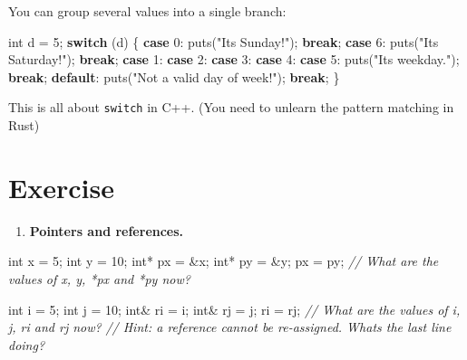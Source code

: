 \documentclass[
]{book}
\newenvironment{Shaded}{\begin{snugshade}}{\end{snugshade}}
\newcommand{\CommentTok}[1]{\textcolor[rgb]{0.56,0.35,0.01}{\textit{#1}}}
\newcommand{\ControlFlowTok}[1]{\textcolor[rgb]{0.13,0.29,0.53}{\textbf{#1}}}
\newcommand{\DataTypeTok}[1]{\textcolor[rgb]{0.13,0.29,0.53}{#1}}
\newcommand{\DecValTok}[1]{\textcolor[rgb]{0.00,0.00,0.81}{#1}}
\newcommand{\NormalTok}[1]{#1}
\newcommand{\StringTok}[1]{\textcolor[rgb]{0.31,0.60,0.02}{#1}}
\providecommand{\tightlist}{%
  \setlength{\itemsep}{0pt}\setlength{\parskip}{0pt}}
\begin{document}
You can group several values into a single branch:

\begin{Shaded}
\begin{Highlighting}[]
\DataTypeTok{int}\NormalTok{ d = }\DecValTok{5}\NormalTok{;}
\ControlFlowTok{switch}\NormalTok{ (d)}
\NormalTok{\{}
\ControlFlowTok{case} \DecValTok{0}\NormalTok{:}
\NormalTok{    puts(}\StringTok{"It\textquotesingle{}s Sunday!"}\NormalTok{);}
    \ControlFlowTok{break}\NormalTok{;}
\ControlFlowTok{case} \DecValTok{6}\NormalTok{:}
\NormalTok{    puts(}\StringTok{"It\textquotesingle{}s Saturday!"}\NormalTok{);}
    \ControlFlowTok{break}\NormalTok{;}
\ControlFlowTok{case} \DecValTok{1}\NormalTok{:}
\ControlFlowTok{case} \DecValTok{2}\NormalTok{:}
\ControlFlowTok{case} \DecValTok{3}\NormalTok{:}
\ControlFlowTok{case} \DecValTok{4}\NormalTok{:}
\ControlFlowTok{case} \DecValTok{5}\NormalTok{:}
\NormalTok{    puts(}\StringTok{"It\textquotesingle{}s weekday."}\NormalTok{);}
    \ControlFlowTok{break}\NormalTok{;}
\ControlFlowTok{default}\NormalTok{:}
\NormalTok{    puts(}\StringTok{"Not a valid day of week!"}\NormalTok{);}
    \ControlFlowTok{break}\NormalTok{;}
\NormalTok{\}}
\end{Highlighting}
\end{Shaded}

This is all about \texttt{switch} in C++. (You need to unlearn the pattern matching in Rust)

\hypertarget{exercise}{%
\section*{Exercise}\label{exercise}}

\begin{enumerate}
\def\labelenumi{\arabic{enumi}.}
\tightlist
\item
  \textbf{Pointers and references.}
\end{enumerate}

\begin{Shaded}
\begin{Highlighting}[]
\DataTypeTok{int}\NormalTok{ x = }\DecValTok{5}\NormalTok{;}
\DataTypeTok{int}\NormalTok{ y = }\DecValTok{10}\NormalTok{;}
\DataTypeTok{int}\NormalTok{* px = \&x;}
\DataTypeTok{int}\NormalTok{* py = \&y;}
\NormalTok{px = py;}
\CommentTok{// What are the values of x, y, *px and *py now?}

\DataTypeTok{int}\NormalTok{ i = }\DecValTok{5}\NormalTok{;}
\DataTypeTok{int}\NormalTok{ j = }\DecValTok{10}\NormalTok{;}
\DataTypeTok{int}\NormalTok{\& ri = i;}
\DataTypeTok{int}\NormalTok{\& rj = j;}
\NormalTok{ri = rj;}
\CommentTok{// What are the values of i, j, ri and rj now?}
\CommentTok{// Hint: a reference cannot be re{-}assigned. What\textquotesingle{}s the last line doing?}
\end{Highlighting}
\end{Shaded}
\end{document}
